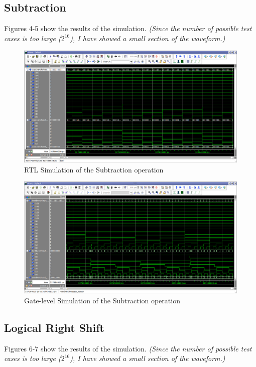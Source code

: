 \documentclass[a4paper, 11pt]{article}
\begin{document}
\newpage
\subsection{Subtraction}
Figures 4-5 show the results of the simulation. \emph{(Since the number of possible test cases is too large ($2^{16}$), I have showed a small section of the waveform.)}

\begin{figure}[H]
\centering
\includegraphics[scale=0.33]{Subtractor_RTL}
\caption{RTL Simulation of the Subtraction operation}
\end{figure}

\begin{figure}[H]
\centering
\includegraphics[scale=0.33]{Subtractor_Gate}
\caption{Gate-level Simulation of the Subtraction operation}
\end{figure}

\newpage
\subsection{Logical Right Shift}
Figures 6-7 show the results of the simulation. \emph{(Since the number of possible test cases is too large ($2^{16}$), I have showed a small section of the waveform.)}
\end{document}
